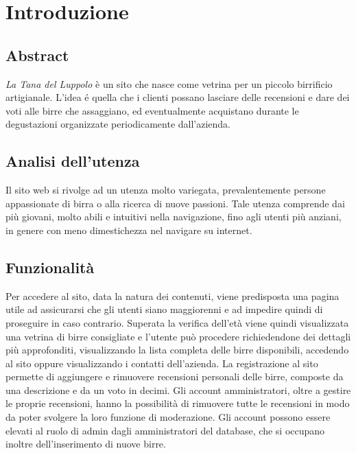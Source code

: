 \section{Introduzione}
\subsection{Abstract}
\textit{La Tana del Luppolo} è un sito che nasce come vetrina per un piccolo birrificio artigianale. L'idea é quella che i clienti possano lasciare delle recensioni e dare dei voti alle birre che assaggiano, ed eventualmente acquistano durante le degustazioni organizzate periodicamente dall'azienda.
\subsection{Analisi dell'utenza}
Il sito web si rivolge ad un utenza molto variegata, prevalentemente persone appassionate di birra o alla ricerca di nuove passioni. Tale utenza comprende dai più giovani, molto abili e intuitivi nella navigazione, fino agli utenti più anziani, in genere con meno dimestichezza nel navigare su internet.

\subsection{Funzionalità}
Per accedere al sito, data la natura dei contenuti, viene predisposta una pagina utile ad assicurarsi che gli utenti siano maggiorenni e ad impedire quindi di proseguire in caso contrario. Superata la verifica dell'età viene quindi visualizzata una vetrina di birre consigliate e l'utente può procedere richiedendone dei dettagli più approfonditi, visualizzando la lista completa delle birre disponibili, accedendo al sito oppure visualizzando i contatti dell'azienda.
La registrazione al sito permette di aggiungere e rimuovere recensioni personali delle birre, composte da una descrizione e da un voto in decimi.
Gli account amministratori, oltre a gestire le proprie recensioni, hanno la possibilità di rimuovere tutte le recensioni in modo da poter svolgere la loro funzione di moderazione.
Gli account possono essere elevati al ruolo di admin dagli amministratori del database, che si occupano inoltre dell'inserimento di nuove birre.

